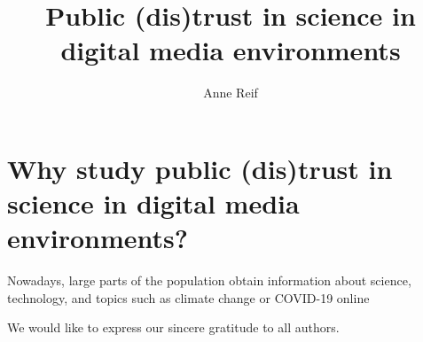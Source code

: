 \documentclass[a4paper,11pt]{article}
\title{Public (dis)trust in science in digital media environments}
\author[Reif,~A.]{Anne
  Reif}{anne.reif@uni-hamburg.de}[0000-0003-4334-5909]{Anne Reif (PhD,
  2021, at Technische Universität Braunschweig, Germany) is a Senior
  Researcher at the University of Hamburg, Germany. Her main research
  interests are in the fields of science communication and digital
  communication. She focuses on public trust in science as well as
  public perceptions of climate change in connection to the use of
  online media.}[reif_anne]
\begin{document}
\section{Why study public (dis)trust in science in digital media environments?}

Nowadays, large parts of the population obtain information about
science, technology, and topics such as climate change or COVID-19
online

\begin{acknowledgments}
  We would like to express our sincere gratitude to all authors.
\end{acknowledgments}
\end{document}
